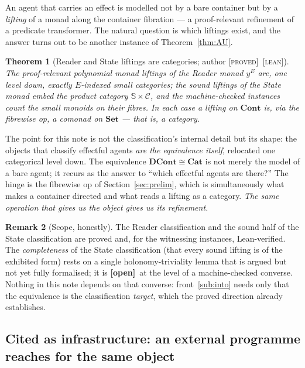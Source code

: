 \documentclass[11pt]{amsart}
\theoremstyle{plain}
\newtheorem{theorem}{Theorem}
\theoremstyle{definition}
\newtheorem{remark}[theorem]{Remark}
\newcommand{\C}{\mathcal{C}}
\newcommand{\Set}{\mathbf{Set}}
\newcommand{\Cat}{\mathbf{Cat}}
\newcommand{\Cont}{\mathbf{Cont}}
\newcommand{\DCont}{\mathbf{DCont}}
\newcommand{\iso}{\cong}
\newcommand{\gProved}{\textsc{[proved]}}
\newcommand{\gLean}{\textsc{[lean]}}
\newcommand{\gOpen}{\textbf{[open]}}
\begin{document}
An agent that carries an effect is modelled not by a bare container but by a \emph{lifting} of a
monad along the container fibration --- a proof-relevant refinement of a predicate transformer.
The natural question is which liftings exist, and the answer turns out to be another instance of
Theorem~\ref{thm:AU}.

\begin{theorem}[Reader and State liftings are categories; author \gProved\ \gLean]\label{thm:liftings}
The proof-relevant polynomial monad liftings of the Reader monad $y^E$ are, one level down,
exactly $E$-indexed small categories; the sound liftings of the State monad embed the product
category $\mathbb{S}\times\C$, and the machine-checked instances count the small monoids on their
fibres. In each case a lifting on $\Cont$ is, via the fibrewise op, a comonad on $\Set$ --- that
is, a category.
\end{theorem}

The point for this note is not the classification's internal detail but its shape: the objects
that classify effectful agents \emph{are the equivalence itself}, relocated one categorical level
down. The equivalence $\DCont\iso\Cat$ is not merely the model of a bare agent; it recurs as the
answer to ``which effectful agents are there?'' The hinge is the fibrewise op of
Section~\ref{sec:prelim}, which is simultaneously what makes a container directed and what reads a
lifting as a category. \emph{The same operation that gives us the object gives us its refinement.}

\begin{remark}[Scope, honestly]
The Reader classification and the sound half of the State classification are proved and, for the
witnessing instances, Lean-verified. The \emph{completeness} of the State classification (that
every sound lifting is of the exhibited form) rests on a single holonomy-triviality lemma that is
argued but not yet fully formalised; it is \gOpen\ at the level of a machine-checked converse.
Nothing in this note depends on that converse: front~\ref{sub:into} needs only that the
equivalence is the classification \emph{target}, which the proved direction already establishes.
\end{remark}

\subsection{Cited as infrastructure: an external programme reaches for the same object}\label{sub:cited}
\end{document}
